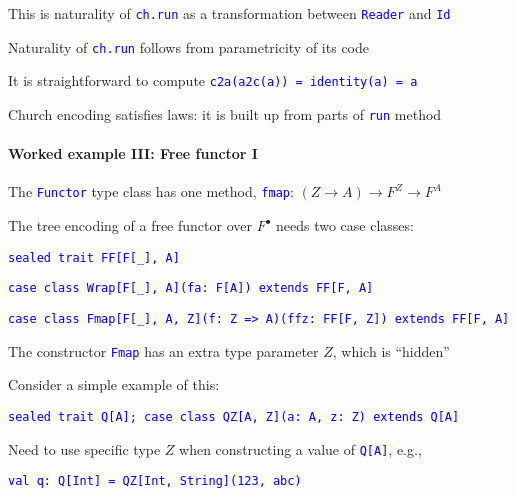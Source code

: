 This is naturality of \texttt{\textcolor{blue}{\footnotesize{}ch.run}}
as a transformation between \texttt{\textcolor{blue}{\footnotesize{}Reader}}
and \texttt{\textcolor{blue}{\footnotesize{}Id}} 

Naturality of \texttt{\textcolor{blue}{\footnotesize{}ch.run}} follows
from parametricity of its code

It is straightforward to compute \texttt{\textcolor{blue}{\footnotesize{}c2a(a2c(a))
= identity(a) = a}} 

Church encoding satisfies laws: it is built up from parts of \texttt{\textcolor{blue}{\footnotesize{}run}}
method

\paragraph{Worked example III: Free functor I}

The \texttt{\textcolor{blue}{\footnotesize{}Functor}} type class has
one method, \texttt{\textcolor{blue}{\footnotesize{}fmap}}: $\left(Z\rightarrow A\right)\rightarrow F^{Z}\rightarrow F^{A}$ 

The tree encoding of a free functor over $F^{\bullet}$ needs two
case classes:

\texttt{\textcolor{blue}{\footnotesize{}sealed trait FF{[}F{[}\_{]},
A{]}}}{\footnotesize\par}

\texttt{\textcolor{blue}{\footnotesize{}case class Wrap{[}F{[}\_{]},
A{]}(fa: F{[}A{]}) extends FF{[}F, A{]}}}{\footnotesize\par}

\texttt{\textcolor{blue}{\footnotesize{}case class Fmap{[}F{[}\_{]},
A, Z{]}(f: Z => A)(ffz: FF{[}F, Z{]}) extends FF{[}F, A{]}}}{\footnotesize\par}

The constructor \texttt{\textcolor{blue}{\footnotesize{}Fmap}} has
an extra type parameter $Z$, which is \textsf{``}hidden\textsf{''}

Consider a simple example of this:

\texttt{\textcolor{blue}{\footnotesize{}sealed trait Q{[}A{]}; case
class QZ{[}A, Z{]}(a: A, z: Z) extends Q{[}A{]}}}{\footnotesize\par}

Need to use specific type $Z$ when constructing a value of \texttt{\textcolor{blue}{\footnotesize{}Q{[}A{]}}},
e.g.,

\texttt{\textcolor{blue}{\footnotesize{}val q: Q{[}Int{]} = QZ{[}Int,
String{]}(123, \textquotedbl abc\textquotedbl )}}{\footnotesize\par}

